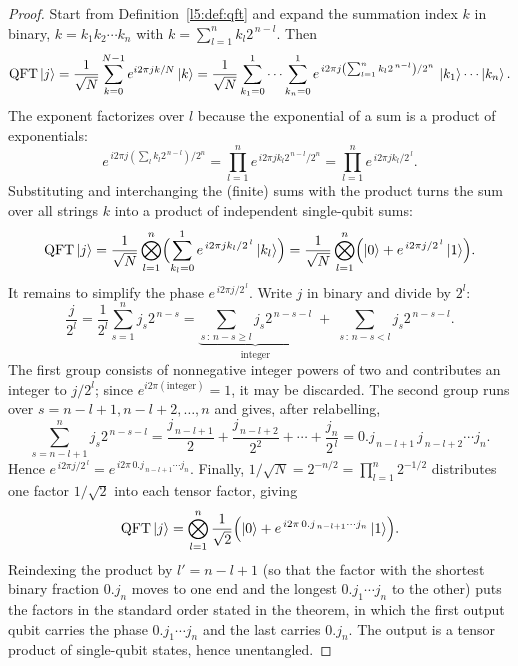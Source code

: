 \begin{proof}
Start from Definition~\ref{l5:def:qft} and expand the summation index $k$ in binary,
$k = k_1 k_2\cdots k_n$ with $k = \sum_{l=1}^{n} k_l 2^{\,n-l}$. Then
\[
  \mathrm{QFT}\ket{j}
   = \frac{1}{\sqrt N}\sum_{k=0}^{N-1} e^{i2\pi jk/N}\ket{k}
   = \frac{1}{\sqrt N}
      \sum_{k_1=0}^{1}\cdots\sum_{k_n=0}^{1}
      e^{\,i 2\pi j \left(\sum_{l=1}^{n} k_l 2^{\,n-l}\right)/2^{n}}\,
      \ket{k_1}\cdots\ket{k_n}.
\]
The exponent factorizes over $l$ because the exponential of a sum is a product
of exponentials:
\[
  e^{\,i 2\pi j \left(\sum_{l} k_l 2^{\,n-l}\right)/2^{n}}
   = \prod_{l=1}^{n} e^{\,i 2\pi j k_l 2^{\,n-l}/2^{n}}
   = \prod_{l=1}^{n} e^{\,i 2\pi j k_l / 2^{\,l}} .
\]
Substituting and interchanging the (finite) sums with the product turns the
sum over all strings $k$ into a product of independent single-qubit sums:
\[
  \mathrm{QFT}\ket{j}
   = \frac{1}{\sqrt N}\bigotimes_{l=1}^{n}
       \Bigl(\sum_{k_l=0}^{1} e^{\,i 2\pi j k_l / 2^{\,l}}\ket{k_l}\Bigr)
   = \frac{1}{\sqrt N}\bigotimes_{l=1}^{n}
       \Bigl(\ket{0} + e^{\,i 2\pi j / 2^{\,l}}\ket{1}\Bigr).
\]
It remains to simplify the phase $e^{\,i 2\pi j/2^{\,l}}$. Write $j$ in binary and
divide by $2^{l}$:
\[
  \frac{j}{2^{l}}
   = \frac{1}{2^{l}}\sum_{s=1}^{n} j_s 2^{\,n-s}
   = \underbrace{\sum_{s\,:\,n-s\ge l} j_s 2^{\,n-s-l}}_{\text{integer}}
     \; + \; \sum_{s\,:\,n-s< l} j_s 2^{\,n-s-l}.
\]
The first group consists of nonnegative integer powers of two and contributes an
integer to $j/2^{l}$; since $e^{i2\pi(\text{integer})}=1$, it may be discarded.
The second group runs over $s = n-l+1, n-l+2, \dots, n$ and gives, after
relabelling,
\[
  \sum_{s=n-l+1}^{n} j_s 2^{\,n-s-l}
   = \frac{j_{\,n-l+1}}{2} + \frac{j_{\,n-l+2}}{2^{2}} + \cdots + \frac{j_n}{2^{\,l}}
   = 0.j_{\,n-l+1}\,j_{\,n-l+2}\cdots j_n .
\]
Hence $e^{\,i 2\pi j/2^{\,l}} = e^{\,i 2\pi\, 0.j_{\,n-l+1}\cdots j_n}$. Finally,
$1/\sqrt N = 2^{-n/2} = \prod_{l=1}^n 2^{-1/2}$ distributes one factor
$1/\sqrt2$ into each tensor factor, giving
\[
  \mathrm{QFT}\ket{j}
   = \bigotimes_{l=1}^{n}\frac{1}{\sqrt2}
     \Bigl(\ket{0}+e^{\,i2\pi\,0.j_{\,n-l+1}\cdots j_n}\ket{1}\Bigr).
\]
Reindexing the product by $l' = n-l+1$ (so that the factor with the shortest
binary fraction $0.j_n$ moves to one end and the longest $0.j_1\cdots j_n$ to the
other) puts the factors in the standard order stated in the theorem, in which
the first output qubit carries the phase $0.j_1\cdots j_n$ and the last carries
$0.j_n$. The output is a tensor product of single-qubit states, hence
unentangled.
\end{proof}

